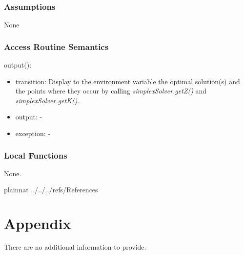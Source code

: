 \documentclass[12pt, titlepage]{article}
\begin{document}
\subsubsection{Assumptions}

None

\subsubsection{Access Routine Semantics}

\noindent 
output():
\begin{itemize}
	\item transition: Display to the environment variable the optimal 
	solution(s) and the points where they occur by calling 
	\textit{simplexSolver.getZ()} and \textit{simplexSolver.getK()}.
	\item output: -
	\item exception: -
\end{itemize}

\subsubsection{Local Functions}

None.

\newpage

 {plainnat}
 {../../../refs/References}

\newpage

\section{Appendix} \label{Appendix}

There are no additional information to provide.
\end{document}
